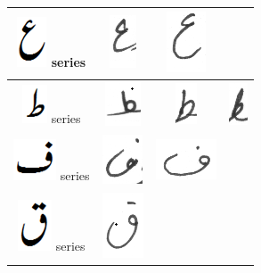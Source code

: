 \begin{table}[h]
\begin{tabular}{@{}cccc@{}}
\hline
\includegraphics[scale=0.15]{aien_orig} series & \includegraphics[scale=0.15]{aein} & \includegraphics[scale=0.10]{aein2}  &  \\
\hline
\includegraphics[scale=0.15]{tuay_orig} series & \includegraphics[scale=0.15]{tuin} & \includegraphics[scale=0.15]{tuin2}  & \includegraphics[scale=0.15]{zuin} \\
\hline
\includegraphics[scale=0.25]{fay_orig} series & \includegraphics[scale=0.25]{faay} & \includegraphics[scale=0.25]{23}  &  \\
\hline
\includegraphics[scale=0.20]{qaaf_orig} series & \includegraphics[scale=0.15]{kahf} & & \\

\end{tabular}
\end{table}
